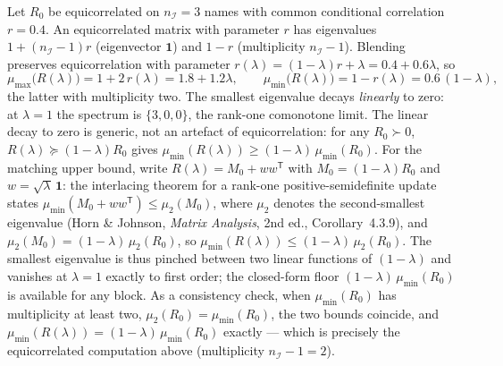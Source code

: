 \begin{example}
\label{ex:admiss:eigen}
Let $R_0$ be equicorrelated on $n_{\mathcal I} = 3$ names with common
conditional correlation $r = 0.4$. An equicorrelated matrix with parameter
$r$ has eigenvalues $1 + (n_{\mathcal I} - 1) r$ (eigenvector
$\mathbf{1}$) and $1 - r$ (multiplicity $n_{\mathcal I} - 1$). Blending
preserves equicorrelation with parameter $r(\lambda) = (1 - \lambda) r +
\lambda = 0.4 + 0.6 \lambda$, so
\[
  \mu_{\max}\bigl(R(\lambda)\bigr) = 1 + 2\, r(\lambda) = 1.8 + 1.2\lambda,
  \qquad
  \mu_{\min}\bigl(R(\lambda)\bigr) = 1 - r(\lambda) = 0.6\, (1 - \lambda),
\]
the latter with multiplicity two. The smallest eigenvalue decays
\emph{linearly} to zero: at $\lambda = 1$ the spectrum is $\{3, 0, 0\}$,
the rank-one comonotone limit. The linear decay to zero is generic, not an
artefact of equicorrelation: for any $R_0 \succ 0$,
$R(\lambda) \succeq (1 - \lambda) R_0$ gives
$\mu_{\min}(R(\lambda)) \ge (1 - \lambda)\, \mu_{\min}(R_0)$. For the
matching upper bound, write $R(\lambda) = M_0 + w w^{\mathsf T}$ with
$M_0 = (1 - \lambda) R_0$ and $w = \sqrt{\lambda}\, \mathbf{1}$: the
interlacing theorem for a rank-one positive-semidefinite update states
$\mu_{\min}(M_0 + w w^{\mathsf T}) \le \mu_2(M_0)$, where $\mu_2$ denotes
the second-smallest eigenvalue (Horn \& Johnson, \emph{Matrix Analysis},
2nd ed., Corollary~4.3.9), and $\mu_2(M_0) = (1 - \lambda)\, \mu_2(R_0)$,
so $\mu_{\min}(R(\lambda)) \le (1 - \lambda)\, \mu_{2}(R_0)$. The smallest
eigenvalue is thus pinched between two linear functions of $(1 - \lambda)$
and vanishes at $\lambda = 1$ exactly to first order; the closed-form
floor $(1 - \lambda)\, \mu_{\min}(R_0)$ is available for any block. As a
consistency check, when $\mu_{\min}(R_0)$ has multiplicity at least two,
$\mu_2(R_0) = \mu_{\min}(R_0)$, the two bounds coincide, and
$\mu_{\min}(R(\lambda)) = (1 - \lambda)\, \mu_{\min}(R_0)$ exactly ---
which is precisely the equicorrelated computation above (multiplicity
$n_{\mathcal I} - 1 = 2$).
\end{example}

